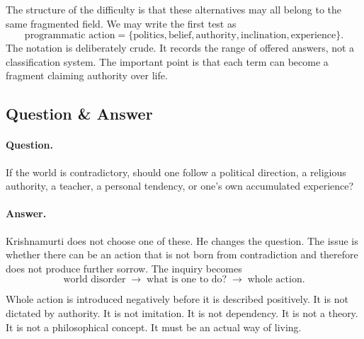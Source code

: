The structure of the difficulty is that these alternatives may all belong to the same fragmented field. We may write the first test as
\begin{equation}
\text{programmatic action}
=
\{\text{politics},\text{belief},\text{authority},\text{inclination},\text{experience}\}.
\end{equation}
The notation is deliberately crude. It records the range of offered answers, not a classification system. The important point is that each term can become a fragment claiming authority over life.

\subsection{Question \& Answer}

\paragraph{Question.}
If the world is contradictory, should one follow a political direction, a religious authority, a teacher, a personal tendency, or one's own accumulated experience?

\paragraph{Answer.}
Krishnamurti does not choose one of these. He changes the question. The issue is whether there can be an action that is not born from contradiction and therefore does not produce further sorrow. The inquiry becomes
\begin{equation}
\text{world disorder}
\;\longrightarrow\;
\text{what is one to do?}
\;\longrightarrow\;
\text{whole action}.
\end{equation}

Whole action is introduced negatively before it is described positively. It is not dictated by authority. It is not imitation. It is not dependency. It is not a theory. It is not a philosophical concept. It must be an actual way of living.

\begin{figure}
\centering
{}
\end{figure}

